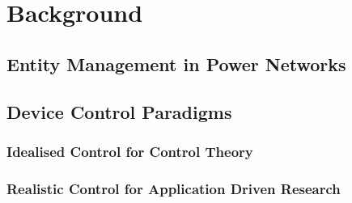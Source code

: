 \section{Background}
\label{ch-review:sec:background}

\subsection{Entity Management in Power Networks}

\subsection{Device Control Paradigms}

\subsubsection{Idealised Control for Control Theory}

\subsubsection{Realistic Control for Application Driven Research}